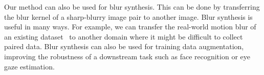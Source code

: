 \documentclass[final]{cvpr}
\newcommand{\Fref}[1]{Fig.~\ref{#1}}
\begin{document}

Our method can also be used for blur synthesis. This can be done by transferring the blur kernel of a sharp-blurry image pair to another image. Blur synthesis is useful in many ways. For example, we can transfer the real-world motion blur of an existing dataset~\cite{rim_2020_ECCV} to another domain where it might be difficult to collect paired data. Blur synthesis can also be used for training data augmentation, improving the robustness of a downstream task such as face recognition or eye gaze estimation.



\end{document}
